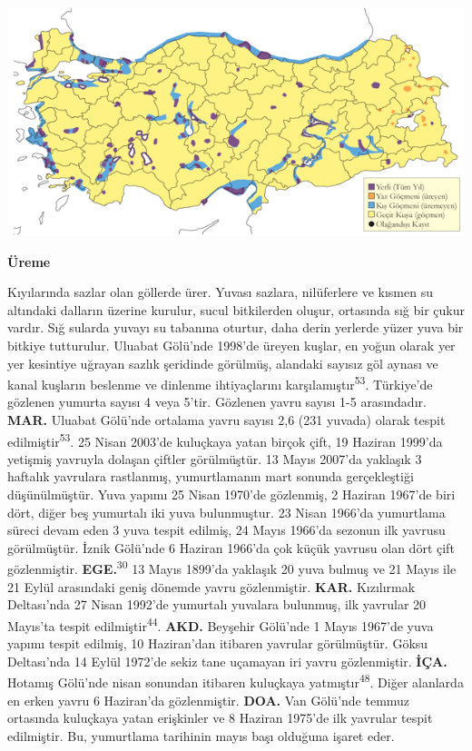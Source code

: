\documentclass[
  letterpaper,
  DIV=11,
  numbers=noendperiod]{scrreprt}
\begin{document}
\includegraphics{images/harita_Page_053.png}

\textbf{Üreme}

Kıyılarında sazlar olan göllerde ürer. Yuvası sazlara, nilüferlere ve
kısmen su altındaki dalların üzerine kurulur, sucul bitkilerden oluşur,
ortasında sığ bir çukur vardır. Sığ sularda yuvayı su tabanına oturtur,
daha derin yerlerde yüzer yuva bir bitkiye tutturulur. Uluabat Gölü'nde
1998'de üreyen kuşlar, en yoğun olarak yer yer kesintiye uğrayan sazlık
şeridinde görülmüş, alandaki sayısız göl aynası ve kanal kuşların
beslenme ve dinlenme ihtiyaçlarını karşılamıştır\textsuperscript{53}.
Türkiye'de gözlenen yumurta sayısı 4 veya 5'tir. Gözlenen yavru sayısı
1-5 arasındadır. \textbf{MAR.} Uluabat Gölü'nde ortalama yavru sayısı
2,6 (231 yuvada) olarak tespit edilmiştir\textsuperscript{53}. 25 Nisan
2003'de kuluçkaya yatan birçok çift, 19 Haziran 1999'da yetişmiş
yavruyla dolaşan çiftler görülmüştür. 13 Mayıs 2007'da yaklaşık 3
haftalık yavrulara rastlanmış, yumurtlamanın mart sonunda gerçekleştiği
düşünülmüştür. Yuva yapımı 25 Nisan 1970'de gözlenmiş, 2 Haziran 1967'de
biri dört, diğer beş yumurtalı iki yuva bulunmuştur. 23 Nisan 1966'da
yumurtlama süreci devam eden 3 yuva tespit edilmiş, 24 Mayıs 1966'da
sezonun ilk yavrusu görülmüştür. İznik Gölü'nde 6 Haziran 1966'da çok
küçük yavrusu olan dört çift gözlenmiştir.
\textbf{EGE.}\textsuperscript{30} 13 Mayıs 1899'da yaklaşık 20 yuva
bulmuş ve 21 Mayıs ile 21 Eylül arasındaki geniş dönemde yavru
gözlenmiştir. \textbf{KAR.} Kızılırmak Deltası'nda 27 Nisan 1992'de
yumurtalı yuvalara bulunmuş, ilk yavrular 20 Mayıs'ta tespit
edilmiştir\textsuperscript{44}. \textbf{AKD.} Beyşehir Gölü'nde 1 Mayıs
1967'de yuva yapımı tespit edilmiş, 10 Haziran'dan itibaren yavrular
görülmüştür. Göksu Deltası'nda 14 Eylül 1972'de sekiz tane uçamayan iri
yavru gözlenmiştir. \textbf{İÇA.} Hotamış Gölü'nde nisan sonundan
itibaren kuluçkaya yatmıştır\textsuperscript{48}. Diğer alanlarda en
erken yavru 6 Haziran'da gözlenmiştir. \textbf{DOA.} Van Gölü'nde temmuz
ortasında kuluçkaya yatan erişkinler ve 8 Haziran 1975'de ilk yavrular
tespit edilmiştir. Bu, yumurtlama tarihinin mayıs başı olduğuna işaret
eder.
\end{document}
